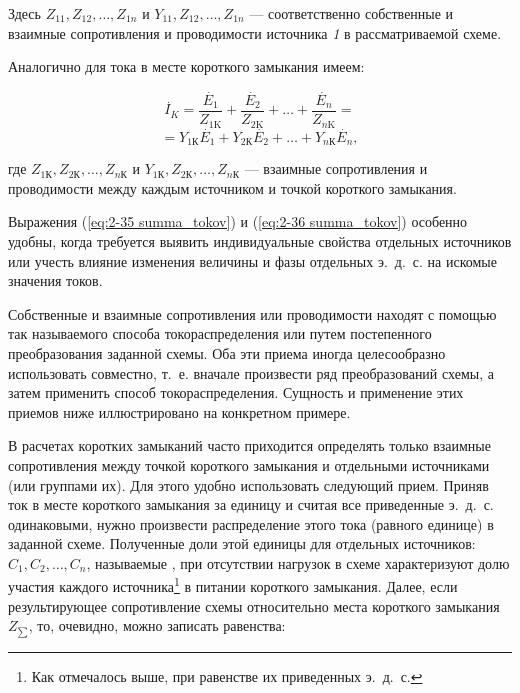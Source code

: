 Здесь $ Z_{11}, Z_{12}, \ldots, Z_{1n} $ и $ Y_{11}, Z_{12}, \ldots, Z_{1n} $ --- соответственно собственные и взаимные сопротивления и проводимости источника \textit{1} в рассматриваемой схеме.

Аналогично для тока в месте короткого замыкания имеем:

\begin{equation*}
	\overset{~.}{I}_{K} = \frac{\overset{~.}{E}_1}{Z_{1\text{K}}} + \frac{\overset{~.}{E}_2}{Z_{2\text{K}}} + \ldots + \frac{\overset{~.}{E}_n}{Z_{n\text{K}}} =
\end{equation*}	
\begin{equation}
	= Y_{1\text{К}}\overset{~.}{E}_1 + Y_{2\text{К}}\overset{~.}{E}_2 + \ldots + Y_{n\text{К}}\overset{~.}{E}_n,
	\label{eq:2-36 summa_tokov}
\end{equation}
  
где $ Z_{1\text{К}}, Z_{2\text{К}}, \ldots, Z_{n\text{К}} $ и $ Y_{1\text{К}}, Z_{2\text{К}}, \ldots, Z_{n\text{К}} $ --- взаимные сопротивления и проводимости между каждым источником и точкой короткого замыкания.

Выражения (\ref{eq:2-35 summa_tokov}) и (\ref{eq:2-36 summa_tokov}) особенно удобны, когда требуется выявить индивидуальные свойства отдельных источников или учесть влияние изменения величины и фазы отдельных э.~д.~с. на искомые значения токов.

Собственные и взаимные сопротивления или проводимости находят с помощью так называемого способа токораспределения или путем постепенного преобразования заданной схемы. Оба эти приема иногда целесообразно использовать совместно, т.~е. вначале произвести ряд преобразований схемы, а затем применить способ токораспределения. Сущность и применение этих приемов ниже иллюстрировано на конкретном примере.

В расчетах коротких замыканий часто приходится определять только взаимные сопротивления между точкой короткого замыкания и отдельными источниками (или группами их). Для этого удобно использовать следующий прием. Приняв ток в месте короткого замыкания за единицу и считая все приведенные э.~д.~с. одинаковыми, нужно произвести распределение этого тока (равного единице) в заданной схеме. Полученные доли этой единицы для отдельных источников: $ C_1, C_2, \ldots, C_n $, называемые , при отсутствии нагрузок в схеме характеризуют долю участия каждого источника\footnote{Как отмечалось выше, при равенстве их приведенных э.~д.~с.} в питании короткого замыкания. Далее, если результирующее сопротивление схемы относительно места короткого замыкания $ Z_{\sum} $, то, очевидно, можно записать равенства:

